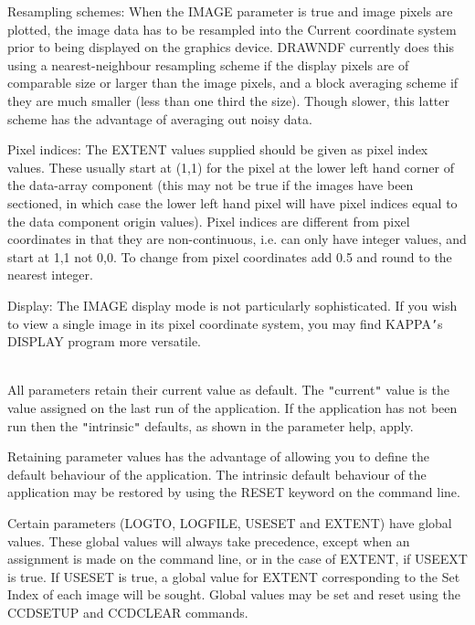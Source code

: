 \documentclass[twoside,11pt]{article}
\newcommand{\htmlref}[2]{#1}
\newcommand{\xref}[3]{#1}
\renewcommand{\_}{\texttt{\symbol{95}}}
\newcommand{\xroutine}[1]{\htmlref{{\sc #1}}{#1}}
\newcommand{\sstdiytopic}[2]{\item[#1:] \mbox{} \\[1.3ex] #2}
\newcommand{\sstitem}{\item}
\newcommand{\sstdiytopic}[2]{\item[{#1:}] #2 }
\newcommand{\sstitem}{\item}
\begin{document}
{{{         \sstitem
         Resampling schemes:
            When the IMAGE parameter is true and image pixels are plotted,
            the image data has to be resampled into the Current coordinate
            system prior to being displayed on the graphics device.
            DRAWNDF currently does this using a nearest-neighbour
            resampling scheme if the display pixels are of comparable
            size or larger than the image pixels, and a block averaging
            scheme if they are much smaller (less than one third the size).
            Though slower, this latter scheme has the advantage of
            averaging out noisy data.

         \sstitem
         Pixel indices:
            The EXTENT values supplied should be given as pixel index values.
            These usually start at (1,1) for the pixel at the lower left
            hand corner of the data-array component (this may
            not be true if the images have been sectioned, in which case the
            lower left hand pixel will have pixel indices equal to the data
            component origin values). Pixel indices are different from
            pixel coordinates in that they are non-continuous, i.e. can
            only have integer values, and start at 1,1 not 0,0. To change
            from pixel coordinates add 0.5 and round to the nearest integer.

         \sstitem
         Display:
            The IMAGE display mode is not particularly sophisticated.
            If you wish to view a single image in its pixel coordinate
            system, you may find KAPPA{\tt '}s \xref{DISPLAY}{sun95}{DISPLAY} program more versatile.
      }
   }
   \sstdiytopic{
      Behaviour of Parameters
   }{
      All parameters retain their current value as default. The
      {\tt "}current{\tt "} value is the value assigned on the last run of the
      application. If the application has not been run then the
      {\tt "}intrinsic{\tt "} defaults, as shown in the parameter help, apply.

      Retaining parameter values has the advantage of allowing you to
      define the default behaviour of the application. The intrinsic
      default behaviour of the application may be restored by using the
      RESET keyword on the command line.

      Certain parameters (LOGTO, LOGFILE, USESET and EXTENT) have global
      values. These global values will always take precedence, except
      when an assignment is made on the command line, or in the case
      of EXTENT, if USEEXT is true.   If USESET is true, a global value
      for EXTENT corresponding to the Set Index of each image will be
      sought.  Global values may be set and reset using the \xroutine{CCDSETUP}
      and \xroutine{CCDCLEAR} commands.

}}
\end{document}
